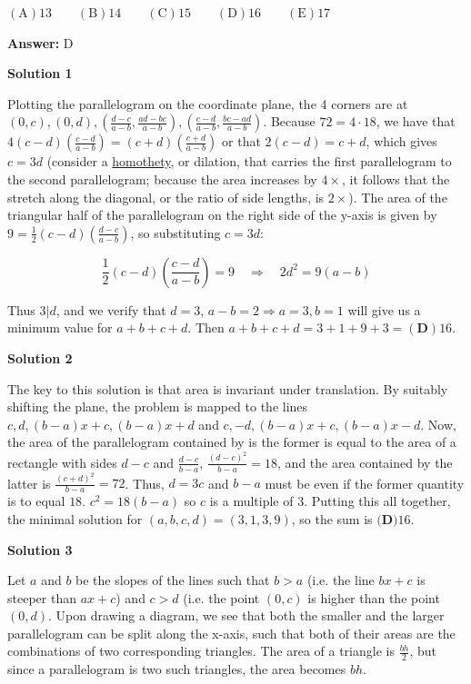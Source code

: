 \begin{enumerate}
 $\mathrm {(A)} 13\qquad \mathrm {(B)} 14\qquad \mathrm {(C)} 15\qquad \mathrm {(D)} 16\qquad \mathrm {(E)} 17$

 \textbf{Answer: }D



\textbf{Solution 1}

Plotting the parallelogram on the coordinate plane, the 4 corners are at $(0,c),(0,d),\left(\frac{d-c}{a-b},\frac{ad-bc}{a-b}\right),\left(\frac{c-d}{a-b},\frac{bc-ad}{a-b}\right)$. Because $72= 4\cdot 18$, we have that $4(c-d)\left(\frac{c-d}{a-b}\right) = (c+d)\left(\frac{c+d}{a-b}\right)$ or that $2(c-d)=c+d$, which gives $c=3d$ (consider a \href{https://artofproblemsolving.com/wiki/index.php?title=Homothety}{homothety}, or dilation, that carries the first parallelogram to the second parallelogram; because the area increases by $4\times$, it follows that the stretch along the diagonal, or the ratio of side lengths, is $2\times$). The area of the triangular half of the parallelogram on the right side of the y-axis is given by $9 = \frac{1}{2} (c-d)\left(\frac{d-c}{a-b}\right)$, so substituting $c = 3d$:

 
 \[\frac{1}{2} (c-d)\left(\frac{c-d}{a-b}\right) = 9 \quad \Longrightarrow \quad 2d^2 = 9(a-b)\]

 Thus $3|d$, and we verify that $d = 3$, $a-b = 2 \Longrightarrow a = 3, b = 1$ will give us a minimum value for $a+b+c+d$. Then $a+b+c+d = 3 + 1 + 9 + 3 = \boxed{\mathbf{(D)} 16}$.

 



\textbf{Solution 2}

The key to this solution is that area is invariant under translation. By suitably shifting the plane, the problem is mapped to the lines $c,d,(b-a)x+c,(b-a)x+d$ and $c,-d,(b-a)x+c,(b-a)x-d$. Now, the area of the parallelogram contained by is the former is equal to the area of a rectangle with sides $d-c$ and $\frac{d-c}{b-a}$, $\frac{(d-c)^2}{b-a}=18$, and the area contained by the latter is $\frac{(c+d)^2}{b-a}=72$. Thus, $d=3c$ and $b-a$ must be even if the former quantity is to equal $18$. $c^2=18(b-a)$ so $c$ is a multiple of $3$. Putting this all together, the minimal solution for $(a,b,c,d)=(3,1,3,9)$, so the sum is $\boxed{\textbf{(D)} 16}$.

 



\textbf{Solution 3}

Let $a$ and $b$ be the slopes of the lines such that $b > a$ (i.e. the line $bx+c$ is steeper than $ax+c$) and $c > d$ (i.e. the point $(0, c)$ is higher than the point $(0, d)$. Upon drawing a diagram, we see that both the smaller and the larger parallelogram can be split along the x-axis, such that both of their areas are the combinations of two corresponding triangles. The area of a triangle is $\frac{bh}{2}$, but since a parallelogram is two such triangles, the area becomes $bh$.


\end{enumerate}
